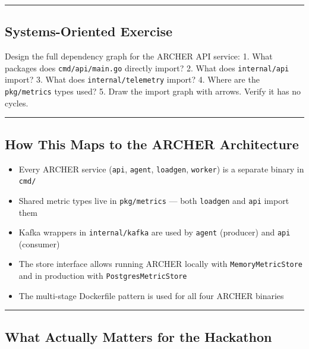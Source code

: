\documentclass[11pt,openany]{book}
\providecommand{\tightlist}{%
  \setlength{\itemsep}{0pt}\setlength{\parskip}{0pt}}
\begin{document}
\begin{center}\rule{0.5\linewidth}{0.5pt}\end{center}

\hypertarget{systems-oriented-exercise-1}{%
\subsection{Systems-Oriented
Exercise}\label{systems-oriented-exercise-1}}

Design the full dependency graph for the ARCHER API service: 1. What
packages does \texttt{cmd/api/main.go} directly import? 2. What does
\texttt{internal/api} import? 3. What does \texttt{internal/telemetry}
import? 4. Where are the \texttt{pkg/metrics} types used? 5. Draw the
import graph with arrows. Verify it has no cycles.

\begin{center}\rule{0.5\linewidth}{0.5pt}\end{center}

\hypertarget{how-this-maps-to-the-archer-architecture-1}{%
\subsection{How This Maps to the ARCHER
Architecture}\label{how-this-maps-to-the-archer-architecture-1}}

\begin{itemize}
\tightlist
\item
  Every ARCHER service (\texttt{api}, \texttt{agent}, \texttt{loadgen},
  \texttt{worker}) is a separate binary in \texttt{cmd/}
\item
  Shared metric types live in \texttt{pkg/metrics} --- both
  \texttt{loadgen} and \texttt{api} import them
\item
  Kafka wrappers in \texttt{internal/kafka} are used by \texttt{agent}
  (producer) and \texttt{api} (consumer)
\item
  The store interface allows running ARCHER locally with
  \texttt{MemoryMetricStore} and in production with
  \texttt{PostgresMetricStore}
\item
  The multi-stage Dockerfile pattern is used for all four ARCHER
  binaries
\end{itemize}

\begin{center}\rule{0.5\linewidth}{0.5pt}\end{center}

\hypertarget{what-actually-matters-for-the-hackathon-1}{%
\subsection{What Actually Matters for the
Hackathon}\label{what-actually-matters-for-the-hackathon-1}}
\end{document}
